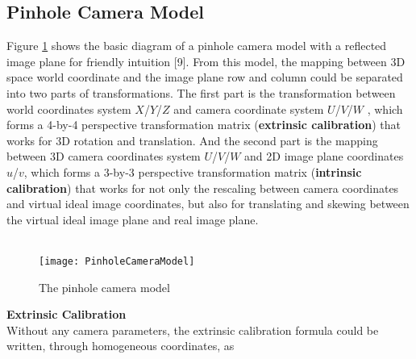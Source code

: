 \subsection{Pinhole Camera Model}
Figure \ref{PinholeCameraModel} shows the basic diagram of a pinhole camera model with a reflected image plane for friendly intuition
[9].%
From this model, the mapping between 3D space world coordinate and the image plane row and column could be separated into two parts of transformations. The first part is the transformation between world coordinates system \(X\)/\(Y\)/\(Z\) and camera coordinate system \(U\)/\(V\)/\(W\) , which forms a 4-by-4 perspective transformation matrix (\textbf{extrinsic calibration}) that works for 3D rotation and translation. And the second part is the mapping between 3D camera coordinates system \(U\)/\(V\)/\(W\) and 2D image plane coordinates  \(u\)/\(v\), which forms a 3-by-3 perspective transformation matrix (\textbf{intrinsic calibration}) that works for not only the rescaling between camera coordinates and virtual ideal image coordinates, but also for translating and skewing between the virtual ideal image plane and real image plane.  \\\\\par

\begin{figure}[h]
\centering
\texttt{[image: PinholeCameraModel]}
\caption{The pinhole camera model}
\label{PinholeCameraModel}
\end{figure}%
%
\textbf{Extrinsic Calibration}\\
Without any camera parameters, the extrinsic calibration formula could be written, through homogeneous coordinates, as

